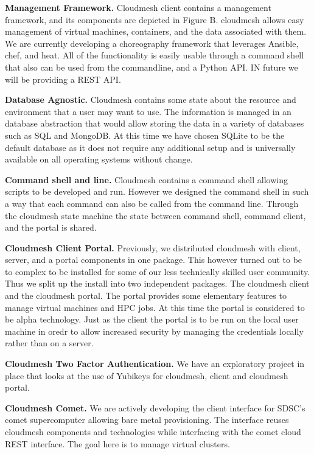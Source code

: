 \parindent 0pt { \bf Management Framework.} Cloudmesh client contains a management framework, and its components are depicted in Figure B. cloudmesh allows easy management of virtual machines, containers, and the data associated with them. We are currently developing a choreography framework that leverages Ansible, chef, and heat. All of the functionality is easily usable through a command shell that also can be used from the commandline, and a Python API. IN future we will be providing a REST API.

\parindent 0pt { \bf Database Agnostic.} Cloudmesh contains some state about the resource and environment that a user may want to use. The information is managed in an database abstraction that would allow storing the data in a variety of databases such as SQL and MongoDB. At this time we have chosen SQLite to be the default database as it does not require any additional setup and is universally available on all operating systems without change.

\parindent 0pt { \bf Command shell and line.} Cloudmesh contains a command shell allowing scripts to be developed and run. However we designed the command shell in such a way that each command can also be called from the command line. Through the cloudmesh state machine the state between command shell, command client, and the portal is shared.

\parindent 0pt { \bf Cloudmesh Client Portal.} Previously, we distributed cloudmesh with client, server, and a portal components in one package. This however turned out to be to complex to be installed for some of our less technically skilled user community. Thus we split up the install into two independent packages. The cloudmesh client and the cloudmesh portal. The portal provides some elementary features to manage virtual machines and HPC jobs. At this time the portal is considered to be alpha technology. Just as the client the portal is to be run on the local user machine in oredr to allow increased security by managing the credentials locally rather than on a server.

\parindent 0pt { \bf Cloudmesh Two Factor Authentication.} We have an exploratory project in place that looks at the use of Yubikeys for cloudmesh, client and cloudmesh portal.

\parindent 0pt { \bf Cloudmesh Comet.} We are actively developing the client interface for SDSC's comet supercomputer allowing bare metal provisioning. The interface reuses cloudmesh components and technologies while interfacing with the comet cloud REST interface. The goal here is to manage virtual clusters.


